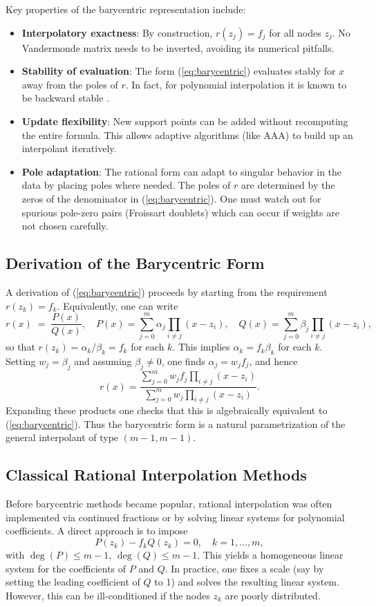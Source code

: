 \documentclass{article}
\begin{document}
Key properties of the barycentric representation include:
\begin{itemize}
\item {\bf Interpolatory exactness}: By construction, $r(z_j)=f_j$ for all nodes $z_j$.  No Vandermonde matrix needs to be inverted, avoiding its numerical pitfalls.
\item {\bf Stability of evaluation}: The form (\ref{eq:barycentric}) evaluates stably for $x$ away from the poles of $r$.  In fact, for polynomial interpolation it is known to be backward stable \cite{BerrutBaltenspergerMittelmann2005}.
\item {\bf Update flexibility}: New support points can be added without recomputing the entire formula. This allows adaptive algorithms (like AAA) to build up an interpolant iteratively.
\item {\bf Pole adaptation}: The rational form can adapt to singular behavior in the data by placing poles where needed.  The poles of $r$ are determined by the zeros of the denominator in (\ref{eq:barycentric}).  One must watch out for spurious pole-zero pairs (Froissart doublets) which can occur if weights are not chosen carefully.
\end{itemize}

\subsection{Derivation of the Barycentric Form}
A derivation of (\ref{eq:barycentric}) proceeds by starting from the requirement $r(z_k)=f_k$.  Equivalently, one can write
\[
r(x) \;=\; \frac{P(x)}{Q(x)}, \quad P(x)=\sum_{j=0}^m \alpha_j \prod_{i\neq j}(x - z_i), \quad
Q(x)=\sum_{j=0}^m \beta_j \prod_{i\neq j}(x - z_i),
\]
so that $r(z_k)=\alpha_k/\beta_k=f_k$ for each $k$.  This implies $\alpha_k = f_k \beta_k$ for each $k$. Setting $w_j = \beta_j$ and assuming $\beta_j \neq 0$, one finds $\alpha_j = w_j f_j$, and hence
\[
r(x) = \frac{\sum_{j=0}^m w_j f_j \prod_{i\neq j}(x - z_i)}
            {\sum_{j=0}^m w_j \prod_{i\neq j}(x - z_i)}.
\]
Expanding these products one checks that this is algebraically equivalent to (\ref{eq:barycentric}).  Thus the barycentric form is a natural parametrization of the general interpolant of type $(m-1,m-1)$.

\subsection{Classical Rational Interpolation Methods}
Before barycentric methods became popular, rational interpolation was often implemented via continued fractions or by solving linear systems for polynomial coefficients.  A direct approach is to impose
\[
P(z_k) - f_k Q(z_k) = 0,\quad k=1,\dots,m,
\]
with $\deg(P)\le m-1$, $\deg(Q)\le m-1$.  This yields a homogeneous linear system for the coefficients of $P$ and $Q$.  In practice, one fixes a scale (say by setting the leading coefficient of $Q$ to 1) and solves the resulting linear system.  However, this can be ill-conditioned if the nodes $z_k$ are poorly distributed.
\end{document}

